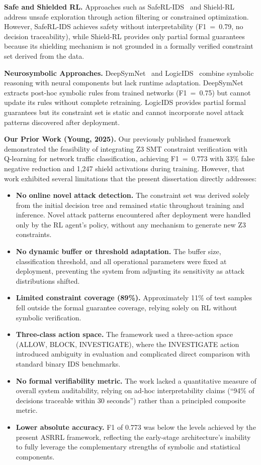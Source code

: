 \documentclass[12pt, letterpaper, oneside]{report}
\newcommand{\ASRRL}{\textsc{ASRRL}}
\begin{document}
\textbf{Safe and Shielded RL.} Approaches such as SafeRL-IDS~\cite{wang2022saferl} and Shield-RL~\cite{kumar2023shield} address unsafe exploration through action filtering or constrained optimization. However, SafeRL-IDS achieves safety without interpretability (F1~=~0.79, no decision traceability), while Shield-RL provides only partial formal guarantees because its shielding mechanism is not grounded in a formally verified constraint set derived from the data.

\textbf{Neurosymbolic Approaches.} DeepSymNet~\cite{zhang2021deepsymnet} and LogicIDS~\cite{li2021logicids} combine symbolic reasoning with neural components but lack runtime adaptation. DeepSymNet extracts post-hoc symbolic rules from trained networks (F1~=~0.75) but cannot update its rules without complete retraining. LogicIDS provides partial formal guarantees but its constraint set is static and cannot incorporate novel attack patterns discovered after deployment.

\textbf{Our Prior Work (Young, 2025).} Our previously published framework~\cite{young2025adaptive} demonstrated the feasibility of integrating Z3 SMT constraint verification with Q-learning for network traffic classification, achieving F1~=~0.773 with 33\% false negative reduction and 1,247 shield activations during training. However, that work exhibited several limitations that the present dissertation directly addresses:
\begin{itemize}
    \item \textbf{No online novel attack detection.} The constraint set was derived solely from the initial decision tree and remained static throughout training and inference. Novel attack patterns encountered after deployment were handled only by the RL agent's policy, without any mechanism to generate new Z3 constraints.
    \item \textbf{No dynamic buffer or threshold adaptation.} The buffer size, classification threshold, and all operational parameters were fixed at deployment, preventing the system from adjusting its sensitivity as attack distributions shifted.
    \item \textbf{Limited constraint coverage (89\%).} Approximately 11\% of test samples fell outside the formal guarantee coverage, relying solely on RL without symbolic verification.
    \item \textbf{Three-class action space.} The framework used a three-action space (ALLOW, BLOCK, INVESTIGATE), where the INVESTIGATE action introduced ambiguity in evaluation and complicated direct comparison with standard binary IDS benchmarks.
    \item \textbf{No formal verifiability metric.} The work lacked a quantitative measure of overall system auditability, relying on ad-hoc interpretability claims (``94\% of decisions traceable within 30 seconds'') rather than a principled composite metric.
    \item \textbf{Lower absolute accuracy.} F1 of 0.773 was below the levels achieved by the present \ASRRL{} framework, reflecting the early-stage architecture's inability to fully leverage the complementary strengths of symbolic and statistical components.
\end{itemize}
\end{document}
